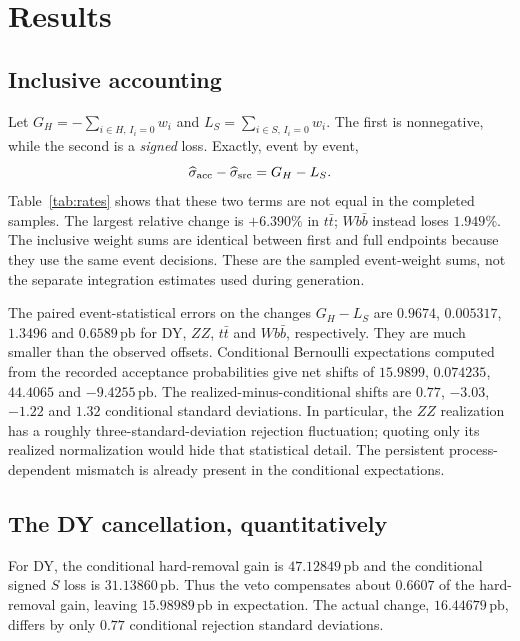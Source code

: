 \documentclass[11pt,a4paper]{article}
\newcommand{\pb}{\,\mathrm{pb}}
\begin{document}
\section{Results}
\label{sec:results}

\subsection{Inclusive accounting}

Let $G_H=-\sum_{i\in H,\,I_i=0}w_i$ and
$L_S=\sum_{i\in S,\,I_i=0}w_i$. The first is nonnegative, while the
second is a \emph{signed} loss. Exactly, event by event,
\begin{equation}
 \widehat\sigma_{\rm acc}-\widehat\sigma_{\rm src}=G_H-L_S.
 \label{eq:accounting}
\end{equation}
Table~\ref{tab:rates} shows that these two terms are not equal in the
completed samples. The largest relative change is $+6.390\%$ in
$t\bar t$; $Wb\bar b$ instead loses $1.949\%$. The inclusive weight sums
are identical between first and full endpoints because they use the
same event decisions. These are the sampled event-weight sums, not
the separate integration estimates used during generation.

The paired event-statistical errors on the changes $G_H-L_S$ are
$0.9674$, $0.005317$, $1.3496$ and $0.6589\pb$ for DY, $ZZ$, $t\bar t$
and $Wb\bar b$, respectively. They are much smaller than the observed
offsets. Conditional Bernoulli expectations computed from the recorded
acceptance probabilities give net shifts of $15.9899$, $0.074235$,
$44.4065$ and $-9.4255\pb$. The realized-minus-conditional shifts are
$0.77$, $-3.03$, $-1.22$ and $1.32$ conditional standard deviations.
In particular, the $ZZ$ realization has a roughly three-standard-deviation
rejection fluctuation; quoting only its realized normalization would
hide that statistical detail. The persistent process-dependent
mismatch is already present in the conditional expectations.

\subsection{The DY cancellation, quantitatively}
\label{sec:dy}
For DY, the conditional hard-removal gain is $47.12849\pb$ and the
conditional signed $S$ loss is $31.13860\pb$. Thus the veto compensates
about $0.6607$ of the hard-removal gain, leaving $15.98989\pb$ in
expectation. The actual change, $16.44679\pb$, differs by only
$0.77$ conditional rejection standard deviations.
\end{document}
